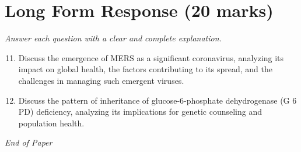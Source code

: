 \documentclass[12pt]{article}
\begin{document}
\section*{Long Form Response (20 marks)}
\textit{Answer each question with a clear and complete explanation.}
\begin{enumerate}[label=\arabic*.]
\setcounter{enumi}{10}
\item Discuss the emergence of MERS as a significant coronavirus, analyzing its impact on global health, the factors contributing to its spread, and the challenges in managing such emergent viruses.
\item Discuss the pattern of inheritance of glucose-6-phosphate dehydrogenase (G 6 PD) deficiency, analyzing its implications for genetic counseling and population health.
\end{enumerate}

\vfill
\noindent\textit{End of Paper}
\end{document}
